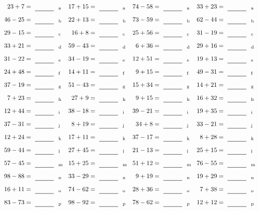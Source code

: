 \documentclass
[
  draft    = true,
  fontsize = 11pt,
  parskip  = half-
]
{scrartcl}
\begin{document}
\clearpage
\begin{align*}
    \pline{23+7}&=\rline{a}
  & \pline{17+15}&=\rline{a}
  & \pline{74-58}&=\rline{a}
  & \pline{33+23}&=\rline{a} \\[1ex]
    \pline{46-25}&=\rline{b}
  & \pline{22+13}&=\rline{b}
  & \pline{73-59}&=\rline{b}
  & \pline{62-44}&=\rline{b} \\[1ex]
    \pline{29-15}&=\rline{c}
  & \pline{16+8}&=\rline{c}
  & \pline{25+56}&=\rline{c}
  & \pline{31-19}&=\rline{c} \\[1ex]
    \pline{33+21}&=\rline{d}
  & \pline{59-43}&=\rline{d}
  & \pline{6+36}&=\rline{d}
  & \pline{29+16}&=\rline{d} \\[1ex]
    \pline{31-22}&=\rline{e}
  & \pline{34-19}&=\rline{e}
  & \pline{12+51}&=\rline{e}
  & \pline{19+13}&=\rline{e} \\[1ex]
    \pline{24+48}&=\rline{f}
  & \pline{14+11}&=\rline{f}
  & \pline{9+15}&=\rline{f}
  & \pline{49-31}&=\rline{f} \\[1ex]
    \pline{37-19}&=\rline{g}
  & \pline{51-43}&=\rline{g}
  & \pline{15+34}&=\rline{g}
  & \pline{14+21}&=\rline{g} \\[1ex]
    \pline{7+23}&=\rline{h}
  & \pline{27+9}&=\rline{h}
  & \pline{9+15}&=\rline{h}
  & \pline{16+32}&=\rline{h} \\[1ex]
    \pline{12+44}&=\rline{i}
  & \pline{38-18}&=\rline{i}
  & \pline{39-21}&=\rline{i}
  & \pline{19+35}&=\rline{i} \\[1ex]
    \pline{37-31}&=\rline{j}
  & \pline{8+19}&=\rline{j}
  & \pline{34+8}&=\rline{j}
  & \pline{33-21}&=\rline{j} \\[1ex]
    \pline{12+24}&=\rline{k}
  & \pline{17+11}&=\rline{k}
  & \pline{37-17}&=\rline{k}
  & \pline{8+28}&=\rline{k} \\[1ex]
    \pline{59-44}&=\rline{l}
  & \pline{27+45}&=\rline{l}
  & \pline{21-13}&=\rline{l}
  & \pline{25+15}&=\rline{l} \\[1ex]
    \pline{57-45}&=\rline{m}
  & \pline{15+25}&=\rline{m}
  & \pline{51+12}&=\rline{m}
  & \pline{76-55}&=\rline{m} \\[1ex]
    \pline{98-88}&=\rline{n}
  & \pline{33-29}&=\rline{n}
  & \pline{9+19}&=\rline{n}
  & \pline{19+29}&=\rline{n} \\[1ex]
    \pline{16+11}&=\rline{o}
  & \pline{74-62}&=\rline{o}
  & \pline{28+36}&=\rline{o}
  & \pline{7+38}&=\rline{o} \\[1ex]
    \pline{83-73}&=\rline{p}
  & \pline{98-92}&=\rline{p}
  & \pline{78-62}&=\rline{p}
  & \pline{12+12}&=\rline{p}
\end{align*}
\end{document}
